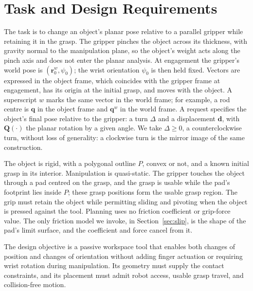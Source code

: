 \section{Task and Design Requirements}
\label{sec:setting}

The task is to change an object's planar pose relative to a parallel gripper while retaining it in the grasp. The gripper pinches the object across its thickness, with gravity normal to the manipulation plane, so the object's weight acts along the pinch axis and does not enter the planar analysis. At engagement the gripper's world pose is $(\mathbf r^w_0,\psi_0)$; the wrist orientation $\psi_0$ is then held fixed. Vectors are expressed in the object frame, which coincides with the gripper frame at engagement, has its origin at the initial grasp, and moves with the object. A superscript $w$ marks the same vector in the world frame; for example, a rod centre is $\mathbf q$ in the object frame and $\mathbf q^w$ in the world frame. A request specifies the object's final pose relative to the gripper: a turn $\Delta$ and a displacement $\mathbf d$, with $\mathbf Q(\cdot)$ the planar rotation by a given angle. We take $\Delta\geq0$, a counterclockwise turn, without loss of generality: a clockwise turn is the mirror image of the same construction.

The object is rigid, with a polygonal outline $P$, convex or not, and a known initial grasp in its interior. Manipulation is quasi-static. The gripper touches the object through a pad centred on the grasp, and the grasp is usable while the pad's footprint lies inside $P$; these grasp positions form the usable grasp region. The grip must retain the object while permitting sliding and pivoting when the object is pressed against the tool. Planning uses no friction coefficient or grip-force value. The only friction model we invoke, in Section~\ref{sec:slip}, is the shape of the pad's limit surface, and the coefficient and force cancel from it.

The design objective is a passive workspace tool that enables both changes of position and changes of orientation without adding finger actuation or requiring wrist rotation during manipulation. Its geometry must supply the contact constraints, and its placement must admit robot access, usable grasp travel, and collision-free motion.
